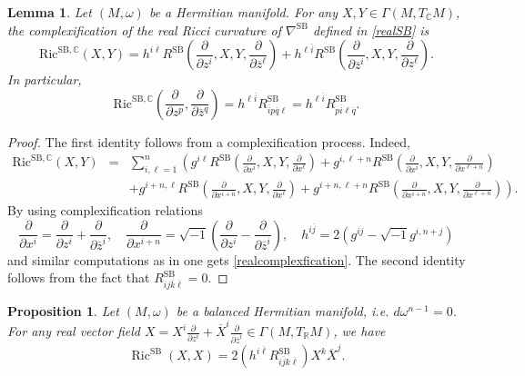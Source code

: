 \documentclass[12pt, reqno]{amsart}
\theoremstyle{plain}
\newtheorem{lemma}[thm]{Lemma}
\newtheorem{prop}[thm]{Proposition}
\theoremstyle{definition}
\newcommand{\bproposition}{\begin{prop}}
\newcommand{\eproposition}{\end{prop}}
\newcommand{\sq}{\sqrt{-1}}
\newcommand{\p}{\partial}
\renewcommand{\bar}{\overline}
\newcommand{\beq}{\begin{equation}}
\newcommand{\eeq}{\end{equation}}
\newcommand{\ee}{\end{eqnarray*}}
\newcommand{\be}{\begin{eqnarray*}}
\renewcommand{\>}{\rightarrow}
\newcommand{\C}{{\mathbb C}}
\newcommand{\R}{{\mathbb R}}
\newcommand{\MS}{\mathrm{SB}}
\newcommand{\Ric}{\mathrm{Ric}}
\newcommand{\bpzi}{\frac{\p}{\p \bar z^i}}
\newcommand{\bpzl}{\frac{\p}{\p \bar z^\ell}}
\newcommand{\pzi}{\frac{\p}{\p z^i}}
\newcommand{\pzl}{\frac{\p}{\p z^\ell}}
\newcommand{\pxi}{\frac{\p}{\p x^i}}
\newcommand{\pxl}{\frac{\p}{\p x^\ell}}
\renewcommand{\>}{\rightarrow}
\renewcommand{\p}{{\partial}}
\numberwithin{equation}{section} %
\begin{document}
\begin{lemma}\label{lem-curvature relation}
	Let $(M,\omega)$ be a Hermitian manifold. For any $X,Y\in \Gamma(M, T_\C M)$, the complexification of the real Ricci curvature of $\nabla^\MS$ defined in \eqref{realSB} is
	\beq 	\Ric^{\MS,\C}\left(X,Y\right)=h^{i\bar{\ell}}R^{\MS}\left(\pzi,X, Y,\bpzl\right)+h^{\ell\bar{i}}R^{\MS}\left(\bpzi,X,Y,\pzl\right). \label{realcomplexfication}\eeq 
	In particular, 
	\beq 	\Ric^{\MS,\C}\left(\frac{\p }{\p z^p},\frac{\p}{\p\bar z^q}\right)=h^{\ell\bar{i}} R^{\MS}_{\bar i p\bar q \ell}=h^{\ell\bar{i}}R^\MS_{p\bar i \ell\bar q}. \eeq 
\end{lemma}
\begin{proof} The first identity follows from a complexification process. Indeed,
	\be 
	\Ric^{\MS,\C}\left(X,Y\right)
	&=&\sum_{i,\ell=1}^n \left(g^{i\ell}R^{\MS}\left(\pxi,X,Y,\pxl\right)+g^{i,\ell+n}R^{\MS}\left(\pxi,X,Y,\frac{\p}{\p x^{\ell+n}}\right)\right.\\
	&&\left.+g^{i+n,\ell}R^{\MS}\left(\frac{\p}{\p x^{i+n}},X,Y,\pxl\right)+g^{i+n,\ell+n}R^{\MS}\left(\frac{\p}{\p x^{i+n}},X,Y,\frac{\p}{\p x^{\ell+n}}\right)\right).\ee 
	By using complexification relations
	$$\frac{\p}{\p x^i}=\pzi+\bpzi, \quad \frac{\partial}{\partial x^{i+n}}=\sqrt{-1}\left(\frac{\partial}{\partial z^i}-\frac{\partial}{\partial \bar{z}^i}\right), \quad h^{i\bar
		j}=2\left(g^{ij}-\sq g^{i,n+j}\right)$$
	and   similar computations as in \cite[Lemma~7.1]{LY16}	one gets \eqref{realcomplexfication}. The second identity follows from the fact that $R^{\MS}_{ij\bar k\bar\ell}=0$.
\end{proof}



\bproposition\label{curvaturecomparison} Let $(M,\omega)$ be a  balanced Hermitian manifold, i.e. $d\omega^{n-1}=0$. For any real vector field $X=X^i\frac{\p}{\p z^i}+\bar{X}^i\frac{\p}{\p \bar z^i}\in \Gamma(M,T_\R M)$, we have 
\beq \operatorname{Ric}^{\MS}(X, X)= 2\left(h^{i\bar \ell} R^{\MS}_{i\bar j k\bar\ell}\right)X^{k}\bar X^j. \label{realricci}\eeq 
\eproposition 
\end{document}
